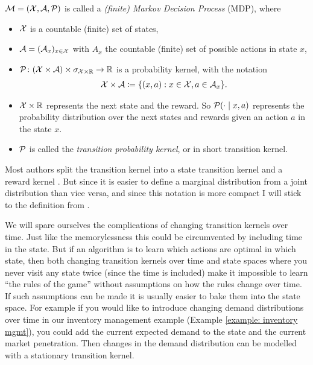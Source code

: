 \begin{definition}
	\(\mathcal{M}=(\mathcal{X},\mathcal{A},\mathcal{P}) \) is called a \emph{(finite) Markov Decision Process} (MDP), where
	\begin{itemize}[noitemsep]
		\item \(\mathcal{X}\) is a countable (finite) set of states,
		\item \(\mathcal{A}=(\mathcal{A}_x)_{x\in\mathcal{X}}\) with \(A_x\) the countable (finite) set of possible actions in state \(x\),
		\item \(\mathcal{P}\colon (\mathcal{X}\times\mathcal{A}) \times \sigma_{\mathcal{X}\times\mathbb{R}} \to \mathbb{R}\) is a probability kernel, with the notation 
		\begin{align}\label{notation: XxA}
			\mathcal{X}\times\mathcal{A}\coloneqq \{(x,a): x\in\mathcal{X}, a\in\mathcal{A}_x \}. 
		\end{align}
		\item \(\mathcal{X}\times\mathbb{R}\) represents the next state and the reward. So \(\mathcal{P}(\cdot\mid x,a) \) represents the probability distribution over the next states and rewards given an action \(a\) in the state \(x\).
		\item \(\mathcal{P}\) is called the \emph{transition probability kernel}, or in short transition kernel.  
	\end{itemize}
\end{definition}
\begin{remark}\label{split state/reward transition kernel }
	Most authors split the transition kernel into a state transition kernel and a reward kernel \parencite[e.g.][]{putermanMarkovDecisionProcesses2005}. But since it is easier to define a marginal distribution from a joint distribution than vice versa, and since this notation is more compact I will stick to the definition from \textcite{szepesvariAlgorithmsReinforcementLearning2010}. 
	
	We will spare ourselves the complications of changing transition kernels over time. Just like the memorylessness this could be circumvented by including time in the state. But if an algorithm is to learn which actions are optimal in which state, then both changing transition kernels over time and state spaces where you never visit any state twice (since the time is included) make it impossible to learn ``the rules of the game'' without assumptions on how the rules change over time. If such assumptions can be made it is usually easier to bake them into the state space. For example if you would like to introduce changing demand distributions over time in our inventory management example (Example \ref{example: inventory mgmt}), you could add the current expected demand to the state and the current market penetration. Then changes in the demand distribution can be modelled with a stationary transition kernel. 
\end{remark}

